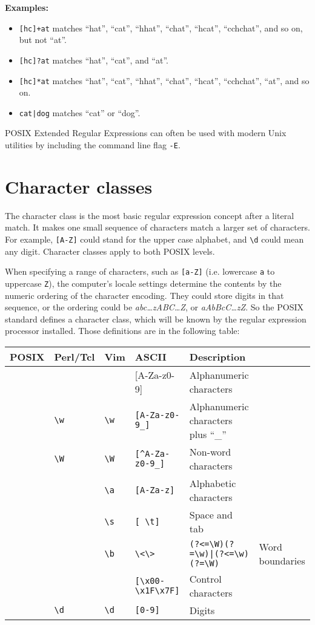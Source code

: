 \textbf{Examples:}
\begin{itemize}
\item \verb|[hc]+at| matches ``hat'', ``cat'', ``hhat'', ``chat'', ``hcat'',
  ``cchchat'', and so on, but not ``at''.
\item \verb|[hc]?at| matches ``hat'', ``cat'', and ``at''.
\item \verb|[hc]*at| matches ``hat'', ``cat'', ``hhat'', ``chat'', ``hcat'',
  ``cchchat'', ``at'', and so on.
\item \verb/cat|dog/ matches ``cat'' or ``dog''.
\end{itemize}

POSIX Extended Regular Expressions can often be used with modern Unix 
utilities by including the command line flag \verb|-E|.

\section{Character classes}
The character class is the most basic regular expression concept after a
literal match. It makes one small sequence of characters match a larger set
of characters. For example, \verb|[A-Z]| could stand for the upper case
alphabet, and \verb|\d| could mean any digit. Character classes apply to
both POSIX levels.

When specifying a range of characters, such as \verb|[a-Z]| (i.e. lowercase
\verb|a| to uppercase \verb|Z|), the computer's locale settings determine
the contents by the numeric ordering of the character encoding. They could
store digits in that sequence, or the ordering could be 
\textsl{abc\ldots zABC\ldots Z}, or \textsl{aAbBcC\ldots zZ}. So the POSIX
standard defines a character class, which will be known by the regular 
expression processor installed. Those definitions are in the following table:
\begin{tabularx}{\textwidth}{|l|l|l|X|X|}
  \hline
  \textbf{POSIX} & \textbf{Perl/Tcl} & \textbf{Vim} & \textbf{ASCII} & \textbf{Description} \\ \hline
  [:alnum:] & & & [A-Za-z0-9] & Alphanumeric characters \\ \hline
  & \verb|\w| & \verb|\w| & \verb|[A-Za-z0-9_]| & Alphanumeric characters plus ``\_'' \\ \hline
  & \verb|\W| & \verb|\W| & \verb|[^A-Za-z0-9_]| & Non-word characters \\ \hline
  [:alpha:] & & \verb|\a| & \verb|[A-Za-z]| & Alphabetic characters \\ \hline
  [:blank:] & & \verb|\s| & \verb|[ \t]| & Space and tab \\ \hline
  & & \verb|\b| & \verb|\<\>| & \verb/(?<=\W)(?=\w)|(?<=\w)(?=\W)/ & Word boundaries \\ \hline
  [:cntrl:] & & & \verb|[\x00-\x1F\x7F]| & Control characters \\ \hline
  [:digit:] & \verb|\d| & \verb|\d| & \verb|[0-9]| & Digits \\ 
  \hline
\end{tabularx}
